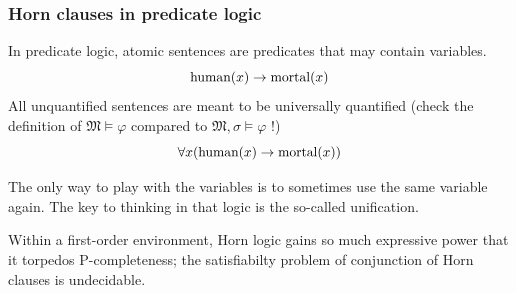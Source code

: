 \begin{frame}[t]
\frametitle{Horn clauses in predicate logic}

In predicate logic, atomic sentences are predicates that may contain variables.
\[  \textup{human}(x)\rightarrow \textup{mortal}(x) \]
All unquantified sentences are meant to be universally quantified (check the definition of $\mathfrak M \models \varphi$ compared to $\mathfrak M, \sigma \models \varphi$ !)
\[  \forall x (\textup{human}(x)\rightarrow \textup{mortal}(x)) \]

The only way to play with the variables is to sometimes use the same variable again. The key to thinking in that logic is the so-called unification.

Within a first-order environment, Horn logic gains so much expressive power that it torpedos P-completeness; the satisfiabilty problem of conjunction of Horn clauses is undecidable.


\end{frame}

